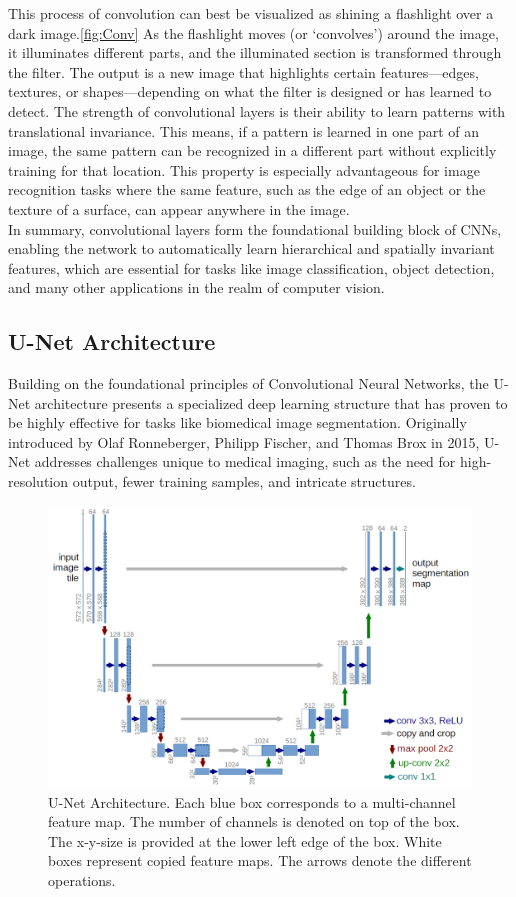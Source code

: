 \noindent This process of convolution can best be visualized as shining a flashlight over a dark image.\autoref{fig:Conv} As the flashlight moves (or `convolves') around the image,
it illuminates different parts, and the illuminated section is transformed through the filter. The output is a new image that highlights certain features—edges,
textures, or shapes—depending on what the filter is designed or has learned to detect.
The strength of convolutional layers is their ability to learn patterns with translational invariance. This means,
if a pattern is learned in one part of an image, the same pattern can be recognized in a different part without explicitly training for that location.
This property is especially advantageous for image recognition tasks where the same feature, such as the edge of an object or the texture of a surface, can appear anywhere in the image.\\[1ex]
In summary, convolutional layers form the foundational building block of CNNs, enabling the network to automatically learn hierarchical and spatially invariant features,
which are essential for tasks like image classification, object detection, and many other applications in the realm of computer vision.

\subsection{U-Net Architecture}
Building on the foundational principles of Convolutional Neural Networks,
the U-Net architecture presents a specialized deep learning structure that has proven to be highly effective for tasks like biomedical image segmentation.
Originally introduced by Olaf Ronneberger, Philipp Fischer, and Thomas Brox in 2015\cite{ronneberger_u-net_2015}, U-Net addresses challenges unique to medical imaging, such as the need for high-resolution output,
fewer training samples, and intricate structures.

\begin{figure}[!hb]
	\centering
	\includegraphics[width=0.8\linewidth]{images/UNet-Architecture}
	\caption{U-Net Architecture. Each blue
	box corresponds to a multi-channel feature map. The number of channels is denoted
	on top of the box. The x-y-size is provided at the lower left edge of the box. White
	boxes represent copied feature maps. The arrows denote the different operations.\cite[2]{ronneberger_u-net_2015}}
	\label{fig:UNet}
\end{figure}

